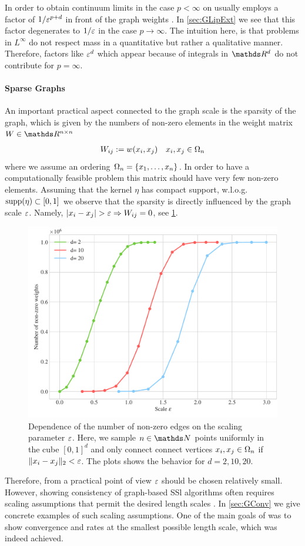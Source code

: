 %
%
%
\begin{remark}{}{}
In order to obtain continuum limits in the case $p<\infty$ on usually employs a factor of $1/\varepsilon^{p+d}$ in front of the graph weights \cite{GarcSlep15, slepcev2019analysis}. In \cref{sec:GLipExt} we see that this factor degenerates to $1/\varepsilon$ in the case $p\to\infty$. The intuition here, is that problems in $L^\infty$ do not respect mass in a quantitative but rather a qualitative manner. Therefore, factors like $\varepsilon^d$ which appear because of integrals in $\R^d$ do not contribute for $p=\infty$.
\end{remark}
%
%
\paragraph{Sparse Graphs}
An important practical aspect connected to the graph scale is the sparsity of the graph, which is given by the numbers of non-zero elements in the weight matrix $W\in\R^{n\times n}$
%
\begin{align*}
W_{ij}:= w(x_i,x_j) \quad x_i,x_j\in\Omega_n
\end{align*}
%
where we assume an ordering $\Omega_n=\{x_1,\ldots, x_n\}$. In order to have a computationally feasible problem this matrix should have very few non-zero elements. Assuming that the kernel $\eta$ has compact support, w.l.o.g. $\mathrm{supp}(\eta)\subset [0,1]$ we observe that the sparsity is directly influenced by the graph scale $\varepsilon$. Namely, $\left|x_i-x_j\right| > \varepsilon \Rightarrow W_{ij}=0$, see \cref{fig:graphscale}.
%
%
\begin{figure}
\centering
\includegraphics[width=.5\textwidth]{code/SSL/NNZ.pdf}
\caption{Dependence of the number of non-zero edges on the scaling parameter $\varepsilon$. Here, we sample $n\in\N$ points uniformly in the cube $[0,1]^d$ and only connect connect vertices $x_i,x_j\in\Omega_n$ if $\|x_i-x_j\|_2 < \varepsilon$. The plots shows the behavior for $d=2,10,20$.}\label{fig:graphscale}
\end{figure} 
%
%
Therefore, from a practical point of view $\varepsilon$ should be chosen relatively small. However, showing consistency of graph-based SSl algorithms often requires scaling assumptions that permit the desired length scales \cite{GarcSlep15, slepcev2019analysis, calder2019consistency}. In \cref{sec:GConv} we give concrete examples of such scaling assumptions. One of the main goals of \cite{roith2022continuum, bungert2021uniform} was to show convergence and rates at the smallest possible length scale, which was indeed achieved.

